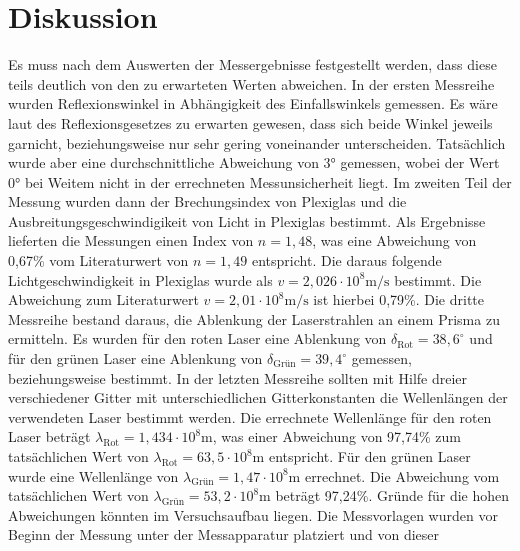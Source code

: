 \section{Diskussion}
\label{sec:Diskussion}

Es muss nach dem Auswerten der Messergebnisse festgestellt werden, dass diese teils deutlich von den zu erwarteten Werten abweichen.
\newline \newline
In der ersten Messreihe wurden Reflexionswinkel in Abhängigkeit des Einfallswinkels gemessen. Es wäre laut des Reflexionsgesetzes zu erwarten gewesen, dass sich beide
Winkel jeweils garnicht, beziehungsweise nur sehr gering voneinander unterscheiden. Tatsächlich wurde aber eine durchschnittliche Abweichung von 3° gemessen, wobei
der Wert 0° bei Weitem nicht in der errechneten Messunsicherheit liegt. 
\newline 
Im zweiten Teil der Messung wurden dann der Brechungsindex von Plexiglas und die Ausbreitungsgeschwindigikeit von Licht in Plexiglas bestimmt. Als Ergebnisse lieferten
die Messungen einen Index von $n = 1,48$, was eine Abweichung von 0,67\% vom Literaturwert von $n = 1,49$ entspricht. Die daraus folgende Lichtgeschwindigkeit in Plexiglas wurde als
$v = 2,026 \cdot 10^8 \si{\meter\per\second}$ bestimmt. Die Abweichung zum Literaturwert $v = 2,01 \cdot 10^8 \si{\meter\per\second}$ ist hierbei 0,79\%.
\newline 
Die dritte Messreihe bestand daraus, die Ablenkung der Laserstrahlen an einem Prisma zu ermitteln. Es wurden für den roten Laser eine Ablenkung von
$\delta_\text{Rot} = 38,6^{\circ}$ und für den grünen Laser eine Ablenkung von $\delta_\text{Grün} = 39,4^{\circ}$ gemessen, beziehungsweise
bestimmt.
\newline 
In der letzten Messreihe sollten mit Hilfe dreier verschiedener Gitter mit unterschiedlichen Gitterkonstanten die Wellenlängen der verwendeten Laser bestimmt werden. Die errechnete
Wellenlänge für den roten Laser beträgt $\lambda_\text{Rot} = 1,434 \cdot 10^8 \si{\meter}$, was einer Abweichung von 97,74\% zum tatsächlichen Wert von
$\lambda_\text{Rot} = 63,5 \cdot 10^8 \si{\meter}$ entspricht. Für den grünen Laser wurde eine Wellenlänge von $\lambda_\text{Grün} = 1,47 \cdot 10^8 \si{\meter}$ errechnet.
Die Abweichung vom tatsächlichen Wert von $\lambda_\text{Grün} = 53,2 \cdot 10^8 \si{\meter}$ beträgt 97,24\%.
\newline\newline
Gründe für die hohen Abweichungen könnten im Versuchsaufbau liegen. Die Messvorlagen wurden vor Beginn der Messung unter der Messapparatur platziert und von dieser
